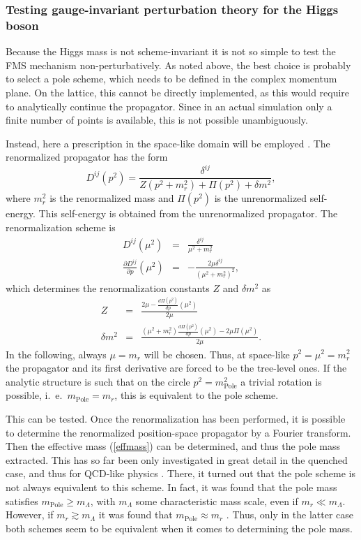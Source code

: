 \documentclass[final,twoside,12pt]{article}
\newcommand*{\no}{\noindent}
\newcommand*{\bea}{\begin{eqnarray}}
\newcommand*{\eea}{\end{eqnarray}}
\newcommand*{\be}{\begin{equation}}
\newcommand*{\ee}{\end{equation}}
\newcommand*{\pd}{\partial}
\newcommand*{\pref}[1]{(\ref{#1})}
\newcommand*{\nn}{\nonumber}
\newcommand*{\1}{1\!\!\!\bot}
\begin{document}
\subsubsection{Testing gauge-invariant perturbation theory for the Higgs boson}\label{sss:higgs}

Because the Higgs mass is not scheme-invariant \cite{Bohm:2001yx} it is not so simple to test the FMS mechanism non-perturbatively. As noted above, the best choice is probably to select a pole scheme, which needs to be defined in the complex momentum plane. On the lattice, this cannot be directly implemented, as this would require to analytically continue the propagator. Since in an actual simulation only a finite number of points is available, this is not possible unambiguously. 

Instead, here a prescription in the space-like domain will be employed \cite{Maas:2010nc,Maas:2016edk}. The renormalized propagator has the form \cite{Bohm:2001yx}
\be
D^{ij}(p^2)=\frac{\delta^{ij}}{Z(p^2+m_r^2)+\Pi(p^2)+\delta m^2}\nn,
\ee
\no where $m_r^2$ is the renormalized mass and $\Pi(p^2)$ is the unrenormalized self-energy. This self-energy is obtained from the unrenormalized propagator. The renormalization scheme is
\bea
D^{ij}(\mu^2)&=&\frac{\delta^{ij}}{\mu^2+m_r^2}\label{prc}\\
\frac{\pd D^{ij}}{\pd p}(\mu^2)&=&-\frac{2\mu\delta^{ij}}{(\mu^2+m_r^2)^2}\label{dprc},
\eea
\no which determines the renormalization constants $Z$ and $\delta m^2$ as
\bea
Z&=&\frac{2\mu-\frac{d\Pi(p^2)}{dp}(\mu^2)}{2\mu}\nn\\
\delta m^2&=&\frac{(\mu^2+m_r^2)\frac{d\Pi(p^2)}{dp}(\mu^2)-2\mu\Pi(\mu^2)}{2\mu}\nn.
\eea
\no In the following, always $\mu=m_r$ will be chosen. Thus, at space-like $p^2=\mu^2=m_r^2$ the propagator and its first derivative are forced to be the tree-level ones. If the analytic structure is such that on the circle $p^2=m_{\text{Pole}}^2$ a trivial rotation is possible, i.\ e.\ $m_\text{Pole}=m_r$, this is equivalent to the pole scheme.

This can be tested. Once the renormalization has been performed, it is possible to determine the renormalized position-space propagator by a Fourier transform. Then the effective mass \pref{effmass} can be determined, and thus the pole mass extracted. This has so far been only investigated in great detail in the quenched case, and thus for QCD-like physics \cite{Maas:2016edk}. There, it turned out that the pole scheme is not always equivalent to this scheme. In fact, it was found that the pole mass satisfies $m_{\text{Pole}}\ge m_\Lambda$, with $m_\Lambda$ some characteristic mass scale, even if $m_r\ll m_{\Lambda}$. However, if $m_r\gtrsim m_\Lambda$ it was found that $m_{\text{Pole}}\approx m_r$ \cite{Maas:2016edk}. Thus, only in the latter case both schemes seem to be equivalent when it comes to determining the pole mass.
\end{document}
